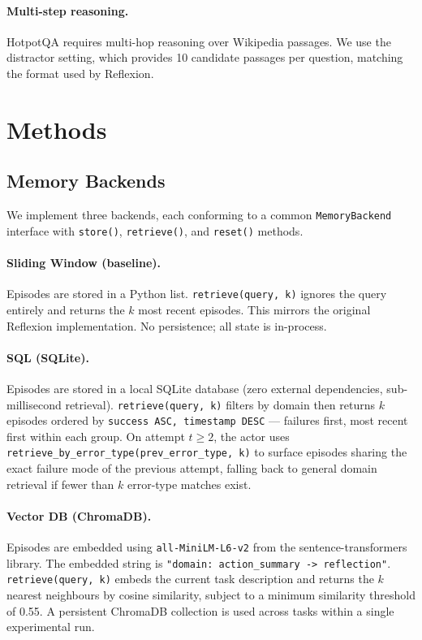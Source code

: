 \documentclass{article}
\begin{document}
\paragraph{Multi-step reasoning.}
HotpotQA \citep{yang2018hotpotqa} requires multi-hop reasoning over Wikipedia
passages. We use the distractor setting, which provides 10 candidate passages
per question, matching the format used by Reflexion.

\section{Methods}
\label{sec:methods}

\subsection{Memory Backends}

We implement three backends, each conforming to a common \texttt{MemoryBackend}
interface with \texttt{store()}, \texttt{retrieve()}, and \texttt{reset()}
methods.

\paragraph{Sliding Window (baseline).}
Episodes are stored in a Python list. \texttt{retrieve(query, k)} ignores the
query entirely and returns the $k$ most recent episodes. This mirrors the
original Reflexion implementation. No persistence; all state is in-process.

\paragraph{SQL (SQLite).}
Episodes are stored in a local SQLite database (zero external dependencies,
sub-millisecond retrieval). \texttt{retrieve(query, k)} filters by domain then
returns $k$ episodes ordered by \texttt{success ASC, timestamp DESC} ---
failures first, most recent first within each group. On attempt $t \geq 2$, the
actor uses \texttt{retrieve\_by\_error\_type(prev\_error\_type, k)} to surface
episodes sharing the exact failure mode of the previous attempt, falling back to
general domain retrieval if fewer than $k$ error-type matches exist.

\paragraph{Vector DB (ChromaDB).}
Episodes are embedded using \texttt{all-MiniLM-L6-v2}
\citep{reimers2019sentencebert} from the sentence-transformers library.
The embedded string is
\texttt{"{domain}: {action\_summary} -> {reflection}"}. \texttt{retrieve(query,
k)} embeds the current task description and returns the $k$ nearest neighbours
by cosine similarity, subject to a minimum similarity threshold of 0.55. A
persistent ChromaDB collection is used across tasks within a single experimental
run.
\end{document}

